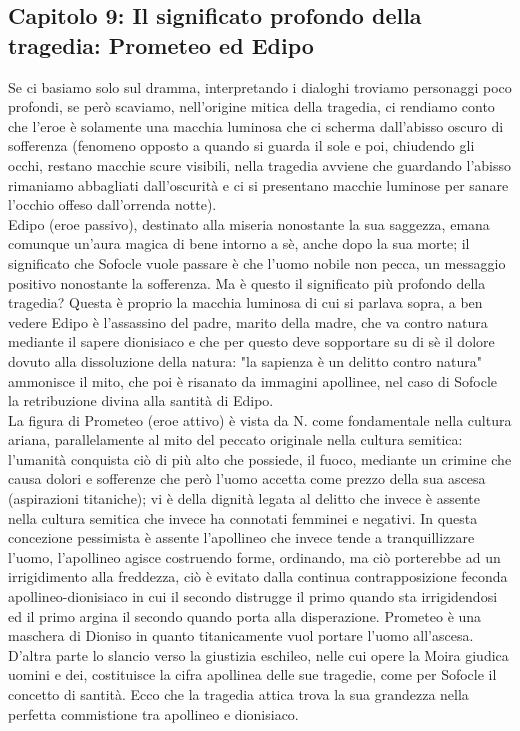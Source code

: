 \documentclass[10pt,a4paper]{article}
\begin{document}
\subsection{Capitolo 9: Il significato profondo della tragedia: Prometeo ed Edipo}
Se ci basiamo solo sul dramma, interpretando i dialoghi troviamo personaggi poco profondi, se però scaviamo, nell'origine mitica della tragedia, ci rendiamo conto che l'eroe è solamente una macchia luminosa che ci scherma dall'abisso oscuro di sofferenza (fenomeno opposto a quando si guarda il sole e poi, chiudendo gli occhi, restano macchie scure visibili, nella tragedia avviene che guardando l'abisso rimaniamo abbagliati dall'oscurità e ci si presentano macchie luminose per sanare l'occhio offeso dall'orrenda notte).\\
Edipo (eroe passivo), destinato alla miseria nonostante la sua saggezza, emana comunque un'aura magica di bene intorno a sè, anche dopo la sua morte; il significato che Sofocle vuole passare è che l'uomo nobile non pecca, un messaggio positivo nonostante la sofferenza. Ma è questo il significato più profondo della tragedia? Questa è proprio la macchia luminosa di cui si parlava sopra, a ben vedere Edipo è l'assassino del padre, marito della madre, che va contro natura mediante il sapere dionisiaco e che per questo deve sopportare su di sè il dolore dovuto alla dissoluzione della natura: "la sapienza è un delitto contro natura" ammonisce il mito, che poi è risanato da immagini apollinee, nel caso di Sofocle la retribuzione divina alla santità di Edipo.\\
La figura di Prometeo (eroe attivo) è vista da N. come fondamentale nella cultura ariana, parallelamente al mito del peccato originale nella cultura semitica: l'umanità conquista ciò di più alto che possiede, il fuoco, mediante un crimine che causa dolori e sofferenze che però l'uomo accetta come prezzo della sua ascesa (aspirazioni titaniche); vi è della dignità legata al delitto che invece è assente nella cultura semitica che invece ha connotati femminei e negativi. In questa concezione pessimista è assente l'apollineo che invece tende a tranquillizzare l'uomo, l'apollineo agisce costruendo forme, ordinando, ma ciò porterebbe ad un irrigidimento alla freddezza, ciò è evitato dalla continua contrapposizione feconda apollineo-dionisiaco in cui il secondo distrugge il primo quando sta irrigidendosi ed il primo argina il secondo quando porta alla disperazione. Prometeo è una maschera di Dioniso in quanto titanicamente vuol portare l'uomo all'ascesa. D'altra parte lo slancio verso la giustizia eschileo, nelle cui opere la Moira giudica uomini e dei, costituisce la cifra apollinea delle sue tragedie, come per Sofocle il concetto di santità. Ecco che la tragedia attica trova la sua grandezza nella perfetta commistione tra apollineo e dionisiaco. 
\end{document}
